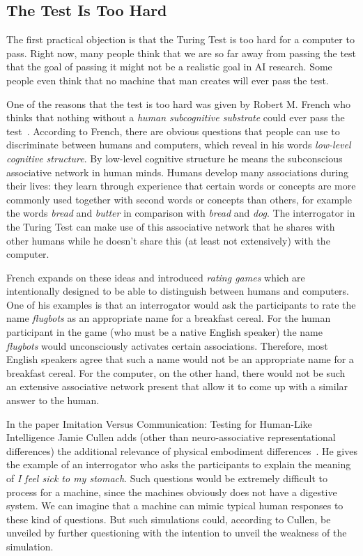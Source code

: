 \subsection{The Test Is Too Hard}
The first practical objection is that the Turing Test is too hard for a computer to pass. Right now, many people think that we are so far away from passing the test that the goal of passing it might not be a realistic goal in AI research. Some people even think that no machine that man creates will ever pass the test.

One of the reasons that the test is too hard was given by Robert M. French who thinks that nothing without a \textit{human subcognitive substrate} could ever pass the test~\cite{french1996subcognition}. According to French, there are obvious questions that people can use to discriminate between humans and computers, which reveal in his words \textit{low-level cognitive structure}. By low-level cognitive structure he means the subconscious associative network in human minds. Humans develop many associations during their lives: they learn through experience that certain words or concepts are more commonly used together with second words or concepts than others, for example the words \textit{bread} and \textit{butter} in comparison with \textit{bread} and \textit{dog}. The interrogator in the Turing Test can make use of this associative network that he shares with other humans while he doesn't share this (at least not extensively) with the computer.

French expands on these ideas and introduced \textit{rating games} which are intentionally designed to be able to distinguish between humans and computers. One of his examples is that an interrogator would ask the participants to rate the name \textit{flugbots} as an appropriate name for a breakfast cereal. For the human participant in the game (who must be a native English speaker) the name \textit{flugbots} would unconsciously activates certain associations. Therefore, most English speakers agree that such a name would not be an appropriate name for a breakfast cereal. For the computer, on the other hand, there would not be such an extensive associative network present that allow it to come up with a similar answer to the human.

In the paper Imitation Versus Communication: Testing for Human-Like Intelligence Jamie Cullen adds (other than neuro-associative representational differences) the additional relevance of physical embodiment differences~\cite{cullen2009imitation}. He gives the example of an interrogator who asks the participants to explain the meaning of \textit{I feel sick to my stomach}. Such questions would be extremely difficult to process for a machine, since the machines obviously does not have a digestive system. We can imagine that a machine can mimic typical human responses to these kind of questions. But such simulations could, according to Cullen, be unveiled by further questioning with the intention to unveil the weakness of the simulation.

